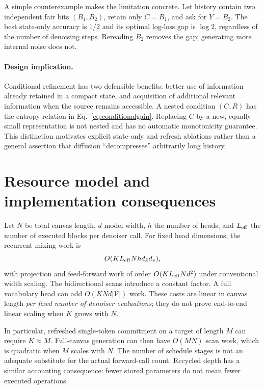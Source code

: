 \documentclass{article}
\theoremstyle{remark}\newtheorem{remark}[theorem]{Remark}
\begin{document}
A simple counterexample makes the limitation concrete. Let history contain two independent fair bits $(B_1,B_2)$, retain only $C=B_1$, and ask for $Y=B_2$. The best state-only accuracy is $1/2$ and its optimal log-loss gap is $\log 2$, regardless of the number of denoising steps. Rereading $B_2$ removes the gap; generating more internal noise does not.

\paragraph{Design implication.}
Conditional refinement has two defensible benefits: better use of information already retained in a compact state, and acquisition of additional relevant information when the source remains accessible. A nested condition $(C,R)$ has the entropy relation in Eq.~\eqref{eq:conditionalgain}. Replacing $C$ by a new, equally small representation is not nested and has no automatic monotonicity guarantee. This distinction motivates explicit state-only and refresh ablations rather than a general assertion that diffusion ``decompresses'' arbitrarily long history.


\section{Resource model and implementation consequences}
\label{sec:resources}
Let $N$ be total canvas length, $d$ model width, $h$ the number of heads, and $L_{\rm eff}$ the number of executed blocks per denoiser call. For fixed head dimensions, the recurrent mixing work is
\begin{equation}
 O(KL_{\rm eff}Nh d_kd_v),
\end{equation}
with projection and feed-forward work of order $O(KL_{\rm eff}Nd^2)$ under conventional width scaling. The bidirectional scans introduce a constant factor. A full vocabulary head can add $O(KNd|\mathcal V|)$ work. These costs are linear in canvas length \emph{per fixed number of denoiser evaluations}; they do not prove end-to-end linear scaling when $K$ grows with $N$.

In particular, refreshed single-token commitment on a target of length $M$ can require $K\approx M$. Full-canvas generation can then have $O(MN)$ scan work, which is quadratic when $M$ scales with $N$. The number of schedule stages is not an adequate substitute for the actual forward-call count. Recycled depth has a similar accounting consequence: fewer stored parameters do not mean fewer executed operations.
\end{document}

